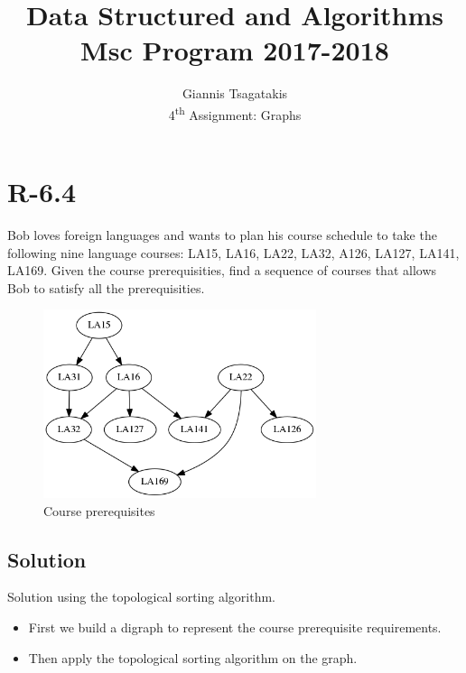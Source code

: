 \documentclass[a4paper,12pt]{article}
\begin{document}
\title{Data Structured and Algorithms\\ Msc Program 2017-2018}
\author{Giannis Tsagatakis\\
4\textsuperscript{th} Assignment: Graphs} 
 
\maketitle

\section*{R-6.4}
Bob loves foreign languages and wants to plan his course schedule to take
the following nine language courses: LA15, LA16, LA22, LA32, A126, LA127,
LA141, LA169. Given the course prerequisities, find a sequence of courses that allows Bob to satisfy all the prerequisities.
\begin{figure}[h] 
	\centering
	\includegraphics[width=8cm]{code/gcourses.png} 
	\caption{Course prerequisites}	 
\end{figure}


\subsection*{Solution}
Solution using the topological sorting algorithm. 
\begin {itemize} 
\item First we build a digraph to represent the course prerequisite requirements. 
\item Then apply the topological sorting algorithm on the graph.
\end {itemize}
\end{document}
